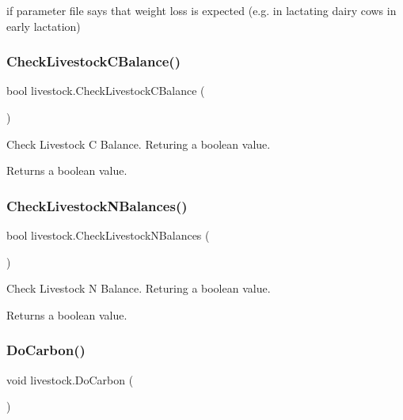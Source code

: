 if parameter file says that weight loss is expected (e.\+g. in lactating dairy cows in early lactation) \mbox{\label{classlivestock_a4c255fb9cb3d61f425e85e4b7c1cbbbb}} 
\subsubsection{\texorpdfstring{CheckLivestockCBalance()}{CheckLivestockCBalance()}}
{\footnotesize\ttfamily bool livestock.\+Check\+Livestock\+C\+Balance (\begin{DoxyParamCaption}{ }\end{DoxyParamCaption})\hspace{0.3cm}{\ttfamily [inline]}}



Check Livestock C Balance. Returing a boolean value. 

\begin{DoxyReturn}{Returns}
a boolean value. 
\end{DoxyReturn}
\mbox{\label{classlivestock_a75c6de36dbd59f4636092f88c8c19798}} 
\subsubsection{\texorpdfstring{CheckLivestockNBalances()}{CheckLivestockNBalances()}}
{\footnotesize\ttfamily bool livestock.\+Check\+Livestock\+N\+Balances (\begin{DoxyParamCaption}{ }\end{DoxyParamCaption})\hspace{0.3cm}{\ttfamily [inline]}}



Check Livestock N Balance. Returing a boolean value. 

\begin{DoxyReturn}{Returns}
a boolean value. 
\end{DoxyReturn}
\mbox{\label{classlivestock_abe11bf02d5a63a5411eb52c8745bdf5c}} 
\subsubsection{\texorpdfstring{DoCarbon()}{DoCarbon()}}
{\footnotesize\ttfamily void livestock.\+Do\+Carbon (\begin{DoxyParamCaption}{ }\end{DoxyParamCaption})\hspace{0.3cm}{\ttfamily [inline]}}



